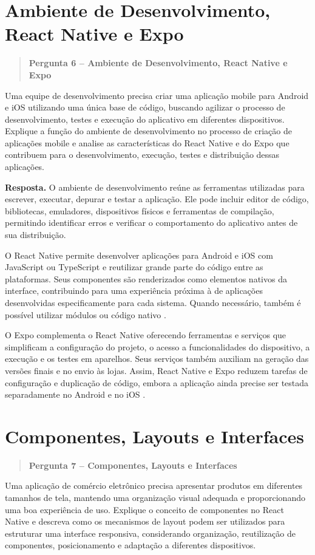 \documentclass[
    12pt,
    oneside,
    a4paper,
    brazil
]{abntex2}
\newcommand{\pergunta}[2]{%
\begin{quote}
\noindent\textbf{Pergunta #1 -- #2}
\end{quote}}
\newcommand{\resposta}{%
\par\noindent\textbf{Resposta.}\hspace{0.3em}
}
\begin{document}
\section{Ambiente de Desenvolvimento, React Native e Expo}
\pergunta{6}{Ambiente de Desenvolvimento, React Native e Expo}

Uma equipe de desenvolvimento precisa criar uma aplicação mobile para Android e iOS utilizando uma única base de código, buscando agilizar o processo de desenvolvimento, testes e execução do aplicativo em diferentes dispositivos. Explique a função do ambiente de desenvolvimento no processo de criação de aplicações mobile e analise as características do React Native e do Expo que contribuem para o desenvolvimento, execução, testes e distribuição dessas aplicações.

\resposta O ambiente de desenvolvimento reúne as ferramentas utilizadas para escrever, executar, depurar e testar a aplicação. Ele pode incluir editor de código, bibliotecas, emuladores, dispositivos físicos e ferramentas de compilação, permitindo identificar erros e verificar o comportamento do aplicativo antes de sua distribuição.

O React Native permite desenvolver aplicações para Android e iOS com JavaScript ou TypeScript e reutilizar grande parte do código entre as plataformas. Seus componentes são renderizados como elementos nativos da interface, contribuindo para uma experiência próxima à de aplicações desenvolvidas especificamente para cada sistema. Quando necessário, também é possível utilizar módulos ou código nativo \cite{reactNativeHome}.

O Expo complementa o React Native oferecendo ferramentas e serviços que simplificam a configuração do projeto, o acesso a funcionalidades do dispositivo, a execução e os testes em aparelhos. Seus serviços também auxiliam na geração das versões finais e no envio às lojas. Assim, React Native e Expo reduzem tarefas de configuração e duplicação de código, embora a aplicação ainda precise ser testada separadamente no Android e no iOS \cite{expoDocs}.

\section{Componentes, Layouts e Interfaces}
\pergunta{7}{Componentes, Layouts e Interfaces}

Uma aplicação de comércio eletrônico precisa apresentar produtos em diferentes tamanhos de tela, mantendo uma organização visual adequada e proporcionando uma boa experiência de uso. Explique o conceito de componentes no React Native e descreva como os mecanismos de layout podem ser utilizados para estruturar uma interface responsiva, considerando organização, reutilização de componentes, posicionamento e adaptação a diferentes dispositivos.
\end{document}
